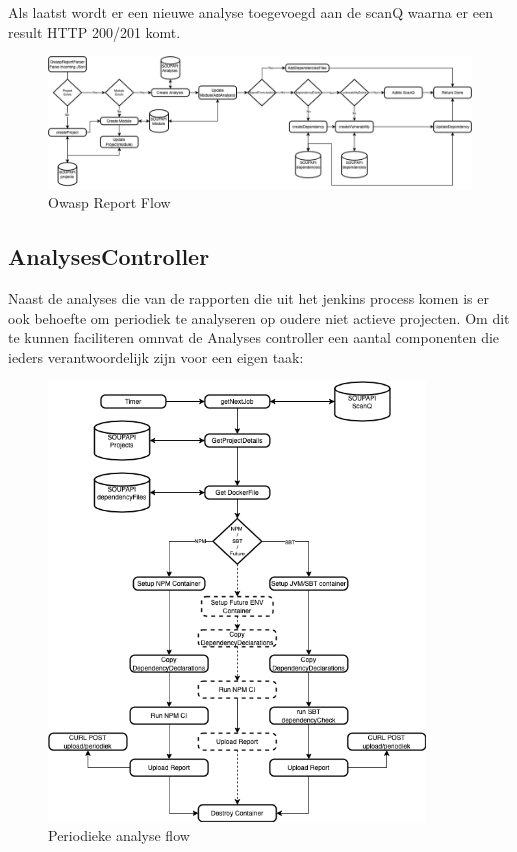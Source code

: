 Als laatst wordt er een nieuwe analyse toegevoegd aan de scanQ waarna er een result HTTP 200/201 komt.
\begin{figure}[H]
    \myfloatalign
    \includegraphics[width=15cm]{gfx/SOUPAPI-ReportParseFlow}
    \caption{Owasp Report Flow}
    \label{fig:OwaspReportFlow}
\end{figure}

\subsection{AnalysesController}\label{subsec:controller}
Naast de analyses die van de rapporten die uit het jenkins process komen is er ook behoefte om periodiek te analyseren op oudere niet actieve projecten. Om dit te kunnen faciliteren omnvat de Analyses controller een aantal componenten die ieders verantwoordelijk zijn voor een eigen taak:

\begin{figure}[H]
    \myfloatalign
    \includegraphics[width=10cm]{gfx/SOUPAPI-Periodic Analysis}
    \caption{Periodieke analyse flow}
    \label{fig:PeriodicAnalysis}
\end{figure}

